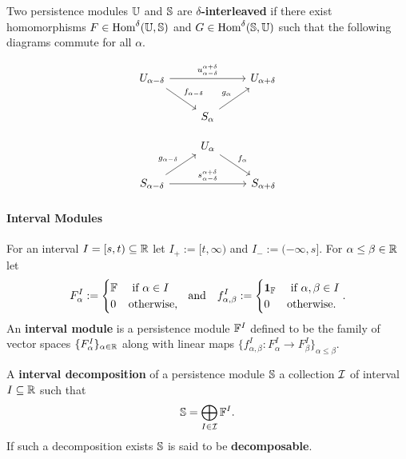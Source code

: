 Two persistence modules $\U$ and $\S$ are \textbf{$\delta$-interleaved} if there exist homomorphisms $F\in\Hom^\delta(\U, \S)$ and $G \in\Hom^\delta(\S,\U)$ such that the following diagrams commute for all $\alpha$.

\begin{minipage}{0.45\textwidth}
\begin{equation}\label{dgm:interleaving1}
  \begin{tikzcd}
    U_{\alpha-\delta}\arrow{rr}{u_{\alpha-\delta}^{\alpha+\delta}}\arrow{dr}{f_{\alpha-\delta}} & &
    U_{\alpha+\delta}\\
    & S_{\alpha}\arrow{ur}{g_\alpha} &
\end{tikzcd}\end{equation}
\end{minipage}
\begin{minipage}{0.45\textwidth}
\begin{equation}\label{dgm:interleaving2}
  \begin{tikzcd}
    & U_{\alpha}\arrow{dr}{f_\alpha} &\\
    S_{\alpha-\delta}\arrow{rr}{s_{\alpha-\delta}^{\alpha+\delta}}\arrow{ur}{g_{\alpha-\delta}} & &
    S_{\alpha+\delta}
\end{tikzcd}\end{equation}
\end{minipage}

\paragraph{Interval Modules}

For an interval $I = [s,t)\subseteq \R$ let $I_+ := [t,\infty)$ and $I_- := (-\infty, s]$.
For $\alpha\leq\beta\in\R$ let
\[ F_\alpha^I := \begin{cases} \FF&\text{ if } \alpha\in I\\ 0 &\text{otherwise,}\end{cases}\ \text{ and }\ \ f_{\alpha,\beta}^I := \begin{cases} \id_\FF&\text{ if } \alpha,\beta\in I\\ 0&\text{otherwise.}\end{cases}.\]
An \textbf{interval module} is a persistence module $\FF^I$ defined to be the family of vector spaces $\{F_\alpha^I\}_{\alpha\in\R}$ along with linear maps $\{f_{\alpha,\beta}^I : F_\alpha^I\to F_\beta^I\}_{\alpha\leq\beta}$.

A \textbf{interval decomposition} of a persistence module $\S$ a collection $\I$ of interval $I\subseteq\R$ such that
\[ \S = \bigoplus_{I\in \I} \FF^I. \]
If such a decomposition exists $\S$ is said to be \textbf{decomposable}.
